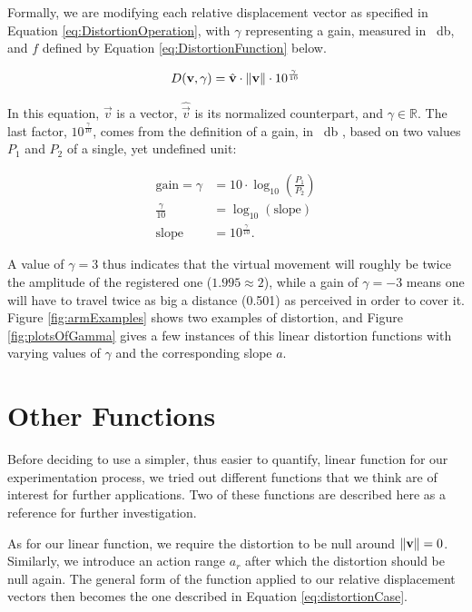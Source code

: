 Formally, we are modifying each relative displacement vector as specified in Equation \ref{eq:DistortionOperation}, with $\gamma$ representing a gain, measured in \SI{}{\decibel}, and $f$ defined by Equation \ref{eq:DistortionFunction} below.

\begin{equation}
\label{eq:DistortionFunction}
D(\mathbf{v},\gamma ) = \hat{\mathbf{v}} \cdot \lVert\mathbf{v}\rVert \cdot 10^{\frac{\gamma}{10}}
\end{equation}

In this equation, $\vec{v}$ is a vector, $\hat{\vec{v}}$ is its normalized counterpart, and $\gamma \in \mathbb{R}$. The last factor, $10^{\frac{\gamma}{10}}$, comes from the definition of a gain, in \SI{}{\decibel} \cite{book:decibel}, based on two values $P_1$ and $P_2$ of a single, yet undefined unit:

\begin{align*}
    \text{gain} = \gamma &= 10 \cdot \log_{10} (\frac{P_1}{P_2})\\
    \frac{\gamma}{10} &= \log_{10} (\text{slope})\\
    \text{slope} &= 10^{\frac{\gamma}{10}}.
\end{align*}

A value of $\gamma = 3$ thus indicates that the virtual movement will roughly be twice the amplitude of the registered one ($1.995 \approx 2$), while a gain of $\gamma = -3$ means one will have to travel twice as big a distance (\num{0.501}) as perceived in order to cover it. Figure \ref{fig:armExamples} shows two examples of distortion, and Figure \ref{fig:plotsOfGamma} gives a few instances of this linear distortion functions with varying values of $\gamma $ and the corresponding slope $a$.

\section{Other Functions}
\label{sec:otherFunctions}
Before deciding to use a simpler, thus easier to quantify, linear function for our experimentation process, we tried out different functions that we think are of interest for further applications. Two of these functions are described here as a reference for further investigation.

As for our linear function, we require the distortion to be null around $\lVert\mathbf{v}\rVert = 0$. Similarly, we introduce an action range $a_r$ after which the distortion should be null again. The general form of the function applied to our relative displacement vectors then becomes the one described in Equation \ref{eq:distortionCase}.

